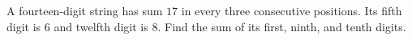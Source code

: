A fourteen-digit string has sum $17$ in every three consecutive positions. Its fifth digit is $6$ and twelfth digit is $8$. Find the sum of its first, ninth, and tenth digits.
